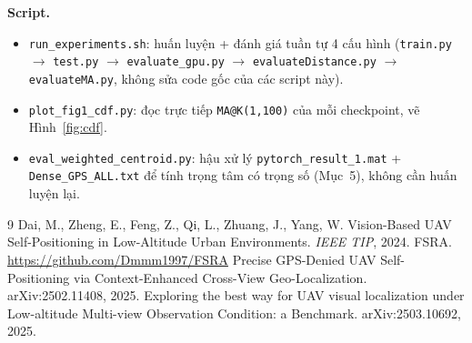 \documentclass[11pt]{article}
\begin{document}
\textbf{Script.}
\begin{itemize}
  \item \texttt{run\_experiments.sh}: huấn luyện + đánh giá tuần tự 4 cấu hình (\texttt{train.py} $\to$ \texttt{test.py} $\to$ \texttt{evaluate\_gpu.py} $\to$ \texttt{evaluateDistance.py} $\to$ \texttt{evaluateMA.py}, không sửa code gốc của các script này).
  \item \texttt{plot\_fig1\_cdf.py}: đọc trực tiếp \texttt{MA@K(1,100)} của mỗi checkpoint, vẽ Hình~\ref{fig:cdf}.
  \item \texttt{eval\_weighted\_centroid.py}: hậu xử lý \texttt{pytorch\_result\_1.mat} + \texttt{Dense\_GPS\_ALL.txt} để tính trọng tâm có trọng số (Mục~5), không cần huấn luyện lại.
\end{itemize}

\begin{thebibliography}{9}
 Dai, M., Zheng, E., Feng, Z., Qi, L., Zhuang, J., Yang, W. Vision-Based UAV Self-Positioning in Low-Altitude Urban Environments. \textit{IEEE TIP}, 2024.
 FSRA. \url{https://github.com/Dmmm1997/FSRA}
 Precise GPS-Denied UAV Self-Positioning via Context-Enhanced Cross-View Geo-Localization. arXiv:2502.11408, 2025.
 Exploring the best way for UAV visual localization under Low-altitude Multi-view Observation Condition: a Benchmark. arXiv:2503.10692, 2025.
\end{thebibliography}
\end{document}
